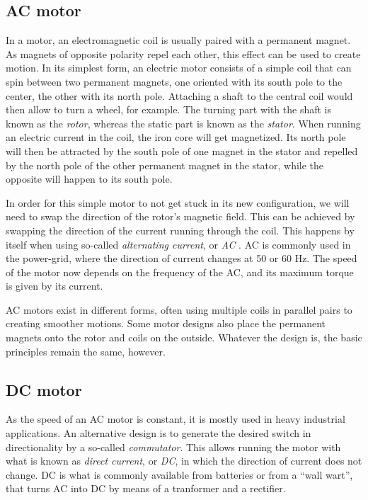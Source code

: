 \subsection{AC motor}
In a motor, an electromagnetic coil is usually paired with a permanent magnet. As magnets of opposite polarity repel each other, this effect can be used to create motion. In its simplest form, an electric motor consists of a simple coil that can spin between two permanent magnets, one oriented with its south pole to the center, the other with its north pole. Attaching a shaft to the central coil would then allow to turn a wheel, for example. The turning part with the shaft is known as the \emph{rotor}, whereas the static part is known as the \emph{stator}. When running an electric current in the coil, the iron core will get magnetized. Its north pole will then be attracted by the south pole of one magnet in the stator and repelled by the north pole of the other permanent magnet in the stator, while the opposite will happen to its south pole.

In order for this simple motor to not get stuck in its new configuration, we will need to swap the direction of the rotor's magnetic field. This can be achieved by swapping the direction of the current running through the coil. This happens by itself when using so-called \emph{alternating current}, or \emph{AC} . AC is commonly used in the power-grid, where the direction of current changes at 50 or 60 Hz. The speed of the motor now depends on the frequency of the AC, and its maximum torque is given by its current. 

AC motors exist in different forms, often using multiple coils in parallel pairs to creating smoother motions. Some motor designs also place the permanent magnets onto the rotor and coils on the outside. Whatever the design is, the basic principles remain the same, however.

\subsection{DC motor}
As the speed of an AC motor is constant, it is mostly used in heavy industrial applications. An alternative design is to generate the desired switch in directionality by a so-called \emph{commutator}. This allows running the motor with what is known as \emph{direct current}, or \emph{DC}, in which the direction of current does not change. DC is what is commonly available from batteries or from a ``wall wart'', that turns AC into DC by means of a tranformer and a rectifier. 

